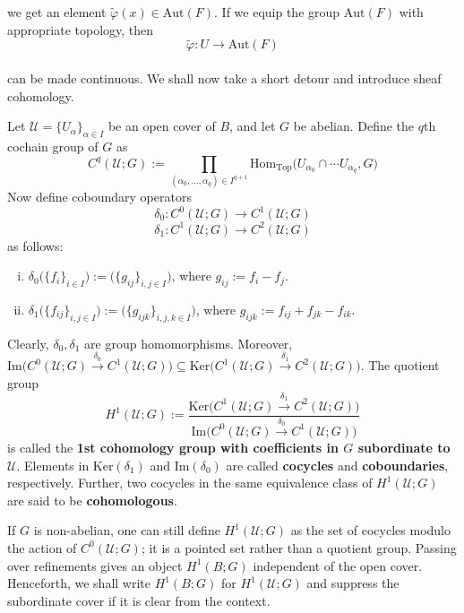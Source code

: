 \documentclass[11pt,a4paper]{article}
\begin{document}
we get an element $\widetilde{\varphi}(x) \in \text{Aut}(F)$. If we equip the group $\text{Aut}(F)$ with appropriate topology, then
$$\widetilde{\varphi}: U \rightarrow \text{Aut}(F)$$\\
can be made continuous. We shall now take a short detour and introduce sheaf cohomology.\\
\begin{definition}
Let $\mathcal{U} = \{U_{\alpha}\}_{\alpha\in I}$ be an open cover of $B$, and let $G$ be abelian. Define the $q$th cochain group of $G$ as
$$C^{q}(\mathcal{U}; G):= \prod\limits_{(\alpha_0, \ldots, \alpha_q)\in I^{q+1}}\text{Hom}_{\text{Top}}\big(U_{\alpha_0}\cap\cdots U_{\alpha_q}, G\big)$$
Now define coboundary operators
$$\delta_0: C^0(\mathcal{U}; G) \rightarrow C^1(\mathcal{U}; G)$$
$$\delta_1: C^1(\mathcal{U}; G) \rightarrow C^2(\mathcal{U}; G)$$
as follows:
\begin{enumerate}[(i)]
    \item $\delta_0\big(\{f_i\}_{i\in I}\big):= \big(\{g_{ij}\}_{i, j\in I}\big)$, where $g_{ij}:= f_i - f_j$.
    \item $\delta_1\big(\{f_{ij}\}_{i, j\in I}\big):= \big(\{g_{ijk}\}_{i, j, k\in I}\big)$, where $g_{ijk}:= f_{ij} + f_{jk} - f_{ik}$.
\end{enumerate}

Clearly, $\delta_0, \delta_1$ are group homomorphisms. Moreover, $\text{Im}\big(C^0(\mathcal{U}; G) \xrightarrow{\delta_0} C^1(\mathcal{U}; G)\big) \subseteq \text{Ker}\big(C^1(\mathcal{U}; G) \xrightarrow{\delta_1} C^2(\mathcal{U}; G)\big)$. The quotient group
$$H^1(\mathcal{U}; G):= \frac{\text{Ker}\big(C^1(\mathcal{U}; G) \xrightarrow{\delta_1} C^2(\mathcal{U}; G)\big)}{\text{Im}\big(C^0(\mathcal{U}; G) \xrightarrow{\delta_0} C^1(\mathcal{U}; G)\big)}$$
is called the \textbf{1st cohomology group with coefficients in $G$ subordinate to $\mathcal{U}$}. Elements in $\text{Ker}(\delta_1)$ and $\text{Im}(\delta_0)$ are called \textbf{cocycles} and \textbf{coboundaries}, respectively. Further, two cocycles in the same equivalence class of $H^1(\mathcal{U}; G)$ are said to be \textbf{cohomologous}.
\end{definition}

\begin{remark}
If $G$ is non-abelian, one can still define $H^1(\mathcal{U};G)$ as the set of cocycles modulo the action of $C^0(\mathcal{U};G)$; it is a pointed set rather than a quotient group. Passing over refinements gives an object $H^1(B; G)$ independent of the open cover. Henceforth, we shall write $H^1(B; G)$ for $H^1(\mathcal{U}; G)$ and suppress the subordinate cover if it is clear from the context.
\end{remark}
\end{document}
